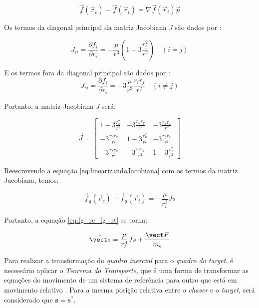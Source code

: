 \begin{equation}
\label{eq:linearizandoJacobiana}
\vec f(\vec r_c) - \vec f(\vec r_t) = \nabla \vec f(\vec r_t)\vec p
\end{equation}

Os termos da diagonal principal da matriz Jacobiana \emph{J} são dados por \cite{fehse2003}:

\begin{equation}
\label{eq:jacobianaDiagonal}
J_{ii} = \frac{\partial f_i}{\partial r_i} = -\frac{\mu}{r^3} \left(1 - 3\frac{r_i^2}{r^2}\right) \quad (i = j)
\end{equation}

E os termos fora da diagonal principal são dados por \cite{fehse2003}:
\begin{equation}
\label{eq:jacobianaForaDiagonal}
J_{ij} = \frac{\partial f_i}{\partial r_i} = -3 \frac{\mu}{r^3} \frac{r_i r_j}{r^2} \quad (i \neq j)
\end{equation}

Portanto, a matriz Jacobiana \emph{J} será:

\begin{equation}
    \label{eq:jacobianaGenerica}
\vec J = 
\begin{bmatrix}
1 - 3\frac{r_x^2}{r^2} &  -3\frac{r_x r_y}{r^2} &  -3\frac{r_x r_z}{r^2} \\
-3\frac{r_y r_x}{r^2} & 1 - 3\frac{r_y^2}{r^2} & -3\frac{r_y r_z}{r^2} \\
-3\frac{r_z r_x}{r^2} & -3\frac{r_z r_y}{r^2} & 1 - 3\frac{r_z^2}{r^2}
\end{bmatrix}
\end{equation}

Reescrevendo a equação \eqref{eq:linearizandoJacobiana} com os termos da matriz Jacobiana, temos:

\begin{equation}
\label{eq:linearizandoJacobiana2}
\vec f_g(\vec r_c) - \vec f_g(\vec r_t) = -\frac{\mu}{r_t^3} Js
\end{equation}

Portanto, a equação \eqref{eq:fg_rc_fg_rt} se torna:

\begin{equation}
\label{eq:fg_rc_fg_rt_linearizada}  
\ddot{\vect s} = \frac{\mu}{r_t^3} Js + \frac{\vect F}{m_c}
\end{equation}

Para realizar a transformação do \emph{quadro inercial} para o \emph{quadro do target}, é necessário aplicar o \emph{Teorema do Transporte}, que é uma forma de transformar as equações do movimento de um sistema de referência para outro que está em movimento relativo \cite{wie2008space, symon1979}. Para a mesma posição relativa entre o \emph{chaser} e o \emph{target}, será considerado que $\mathbf s = \mathbf s^{*}$.

